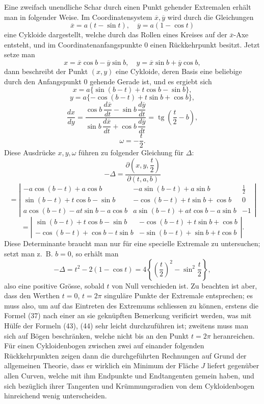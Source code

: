 \documentclass[11pt,a4paper,leqno]{article}
\newcommand{\tg}{\operatorname{tg}}
\begin{document}
Eine zweifach unendliche Schar durch einen Punkt gehender Extremalen erhält man in folgender Weise. Im Coordinatensystem $\overline{x},\overline{y}$ wird durch die Gleichungen
\begin{equation}\tag{43}
\overline{x}=a(t-\sin t),\quad \overline{y}=a(1-\cos t)
\end{equation}
eine Cykloide dargestellt, welche durch das Rollen eines Kreises auf der $\overline{x}$-Axe entsteht, und im Coordinatenanfangspunkte 0 einen Rückkehrpunkt besitzt. Jetzt setze man
\begin{equation}\tag{44}
x=\overline{x}\cos b-\overline{y}\sin b,\quad
y=\overline{x}\sin b+\overline{y}\cos b,
\end{equation}
dann beschreibt der Punkt $(x,y)$ eine Cykloide, deren Basis eine beliebige durch den Anfangspunkt 0 gehende Gerade ist, und es ergiebt sich
\[
x=a\{\sin(b-t)+t\cos b-\sin b\},
\]
\[
y=a\{-\cos(b-t)+t\sin b+\cos b\},
\]
\[
\frac{dx}{dy}=
\frac{\cos b\,\dfrac{d\overline{x}}{dt}-\sin b\,\dfrac{d\overline{y}}{dt}}
{\sin b\,\dfrac{d\overline{x}}{dt}+\cos b\,\dfrac{d\overline{y}}{dt}}
=\tg\left(\frac{t}{2}-b\right),
\]
\[
\omega=-\frac{t}{2}.
\]
Diese Ausdrücke $x,y,\omega$ führen zu folgender Gleichung für $\Delta$:
\[
-\Delta=
\frac{\partial\left(x,y,\dfrac{t}{2}\right)}{\partial(t,a,b)}
\]
\[
=
\left|
\begin{array}{ccc}
-a\cos(b-t)+a\cos b & -a\sin(b-t)+a\sin b & \frac12\\
\sin(b-t)+t\cos b-\sin b & -\cos(b-t)+t\sin b+\cos b & 0\\
a\cos(b-t)-at\sin b-a\cos b & a\sin(b-t)+at\cos b-a\sin b & -1
\end{array}
\right|
\]
\[
=
\left|
\begin{array}{cc}
\sin(b-t)+t\cos b-\sin b & -\cos(b-t)+t\sin b+\cos b\\
-\cos(b-t)+\cos b-t\sin b & -\sin(b-t)+\sin b+t\cos b
\end{array}
\right|.
\]
Diese Determinante braucht man nur für eine specielle Extremale zu untersuchen; setzt man z.~B. $b=0$, so erhält man
\[
-\Delta=t^2-2(1-\cos t)=4\left\{\left(\frac{t}{2}\right)^2-\sin^2\frac{t}{2}\right\},
\]
also eine positive Grösse, sobald $t$ von Null verschieden ist. Zu beachten ist aber, dass den Werthen $t=0$, $t=2\pi$ singuläre Punkte der Extremale entsprechen; es muss also, um auf das Eintreten des Extremums schliessen zu können, erstens die Formel (37) nach einer an sie geknüpften Bemerkung verificirt werden, was mit Hülfe der Formeln (43), (44) sehr leicht durchzuführen ist; zweitens muss man sich auf Bögen beschränken, welche nicht bis an den Punkt $t=2\pi$ heranreichen. Für einen Cykloidenbogen zwischen zwei auf einander folgenden Rückkehrpunkten zeigen dann die durchgeführten Rechnungen auf Grund der allgemeinen Theorie, dass er wirklich ein Minimum der Fläche $J$ liefert gegenüber allen Curven, welche mit ihm Endpunkte und Endtangenten gemein haben, und sich bezüglich ihrer Tangenten und Krümmungsradien von dem Cykloidenbogen hinreichend wenig unterscheiden.
\end{document}
